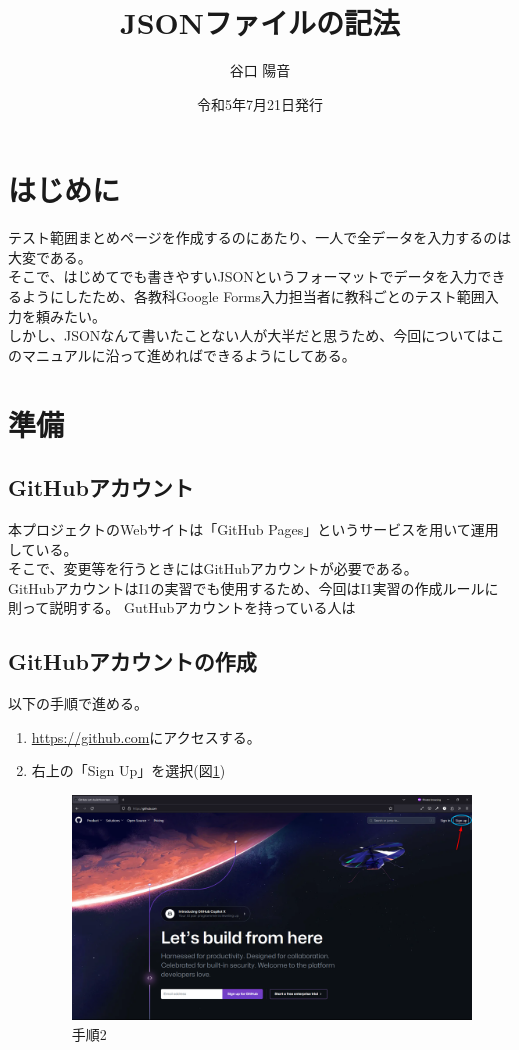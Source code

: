 \documentclass{ltjsarticle}
\begin{document}
\begin{titlepage}
    \title{JSONファイルの記法}
    \author{谷口 陽音}
    \date{令和5年7月21日発行}
    \maketitle
\end{titlepage}
\section{はじめに}
テスト範囲まとめページを作成するのにあたり、一人で全データを入力するのは大変である。\\
そこで、はじめてでも書きやすいJSONというフォーマットでデータを入力できるようにしたため、各教科Google Forms入力担当者に教科ごとのテスト範囲入力を頼みたい。\\
しかし、JSONなんて書いたことない人が大半だと思うため、今回についてはこのマニュアルに沿って進めればできるようにしてある。
\section{準備}
\subsection{GitHubアカウント}
本プロジェクトのWebサイトは「GitHub Pages」というサービスを用いて運用している。\\
そこで、変更等を行うときにはGitHubアカウントが必要である。\\
GitHubアカウントはI1の実習でも使用するため、今回はI1実習の作成ルールに則って説明する。
GutHubアカウントを持っている人は
\subsection{GitHubアカウントの作成}
以下の手順で進める。
\begin{enumerate}
    \item \url{https://github.com}にアクセスする。
    \item 右上の「Sign Up」を選択(図\ref{github_top})
    \begin{figure}[htpb]
        \includegraphics[width=15cm]{pictures/github_top.png}
        \caption{手順2}\label{github_top}
    \end{figure}
\end{enumerate}
\begin{figure}
    
\end{figure}
\end{document}
